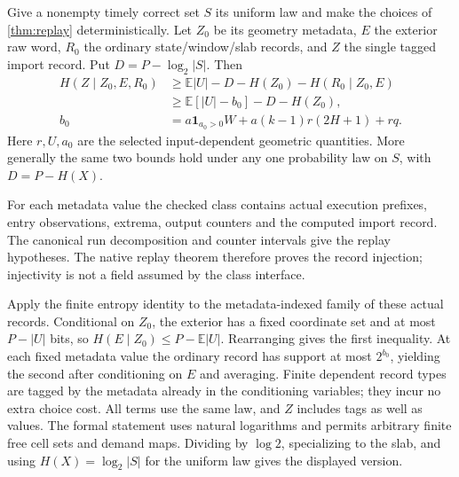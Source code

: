 \begin{corollary}\label{cor:import-information}
Give a nonempty timely correct set $S$ its uniform law and make the choices
of \cref{thm:replay} deterministically. Let $Z_0$ be its geometry metadata,
$E$ the exterior raw word, $R_0$ the ordinary state/window/slab records,
and $Z$ the single tagged import record. Put $D=P-\log_2|S|$. Then
\begin{align*}
 H(Z\mid Z_0,E,R_0)
 &\ge\mathbb E|U|-D-H(Z_0)-H(R_0\mid Z_0,E)\\
 &\ge\mathbb E[|U|-b_0]-D-H(Z_0),\\
 b_0&=a\mathbf1_{a_0>0}W+a(k-1)r(2H+1)+rq.
\end{align*}
Here $r,U,a_0$ are the selected input-dependent geometric quantities.
More generally the same two bounds hold under any one probability law on
$S$, with $D=P-H(X)$.
\end{corollary}
\begin{outline}
For each metadata value the checked class contains actual execution prefixes,
entry observations, extrema, output counters and the computed import record.
The canonical run decomposition and counter intervals give the replay
hypotheses. The native replay theorem therefore proves the record injection;
injectivity is not a field assumed by the class interface.

Apply the finite entropy identity to the metadata-indexed family of these
actual records. Conditional on $Z_0$, the exterior has a fixed coordinate
set and at most $P-|U|$ bits, so
$H(E\mid Z_0)\le P-\mathbb E|U|$. Rearranging gives the first inequality.
At each fixed metadata value the ordinary record has support at most
$2^{b_0}$, yielding the second after conditioning on $E$ and averaging.
Finite dependent record types are tagged by the metadata already in the
conditioning variables; they incur no extra choice cost. All terms use the
same law, and $Z$ includes tags as well as values. The formal statement uses
natural logarithms and permits arbitrary finite free cell sets and demand
maps. Dividing by $\log 2$, specializing to the slab, and using
$H(X)=\log_2|S|$ for the uniform law gives the displayed version.
\end{outline}

